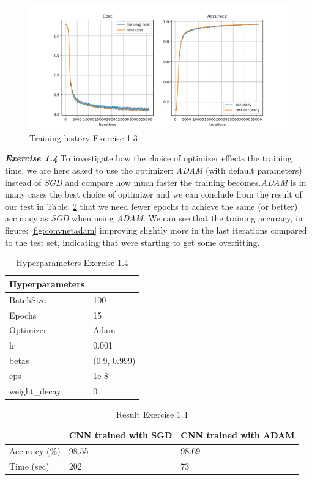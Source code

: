 \documentclass[a4paper,10pt]{article}
\begin{document}
\begin{figure}[ht!]
\centering
\includegraphics[width=120mm]{figures/assignment_3/convnet_swapped.png}
\caption{Training history Exercise 1.3}
\label{fig:example}
\end{figure}


\textit{\textbf{Exercise 1.4}} To investigate how the choice of optimizer effects the training time, we are here asked to use the optimizer: \emph{ADAM} (with default parameters) instead of \emph{SGD} and compare how much faster the training becomes.\emph{ADAM} is in many cases the best choice of optimizer and we can conclude from the result of our test in Table: \ref{tab:tab6} that we need fewer epochs to achieve the same (or better) accuracy as \emph{SGD} when using \emph{ADAM}. We can see that the training accuracy, in figure: \ref{fig:convnetadam} improving slightly more in the last iterations compared to the test set, indicating that were starting to get some overfitting.

\begin{table}[ht!]
\centering
\begin{tabular}{ll}\hline
 \textbf{Hyperparameters}&    \\ \hline
 BatchSize&  100  \\
 Epochs&  15 \\ 
 Optimizer& Adam  \\
 lr& 0.001 \\
 betas&  (0.9, 0.999) \\
 eps& 1e-8 \\
 weight\_decay& 0 \\ \hline
\end{tabular}
\caption{Hyperparameters Exercise 1.4}
\label{tab:tab3}
\end{table}

\begin{table}[ht!]
\centering
\begin{tabular}{lll}\hline
 &  \textbf{CNN trained with SGD}& \textbf{CNN trained with ADAM} \\ \hline
 Accuracy (\%) &98.55  & 98.69\\
 Time (sec)&  202& 73 \\ \hline
\end{tabular}
\caption{Result Exercise 1.4}
\label{tab:tab6}
\end{table}
\end{document}
